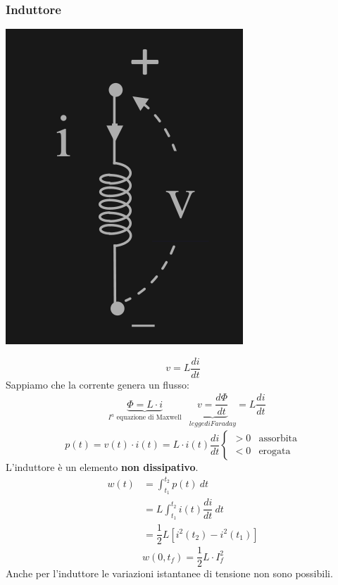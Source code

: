 \documentclass{article}
\begin{document}
\subsubsection{Induttore}
\begin{center}
    \includegraphics[scale=0.22]{Image/Induttore.png}
\end{center}
\[
    v= L \dfrac{di}{dt}
\]
Sappiamo che la corrente genera un flusso:
\begin{align*}
    &\underbrace{\Phi = L \cdot i}_{I^a\text{ equazione di Maxwell}} & \underbrace{v= \dfrac{d \Phi}{dt}}_{legge di Faraday} = L \dfrac{di}{dt}
\end{align*}
\[
    p(t) = v(t) \cdot i(t) = L \cdot i(t) \dfrac{di}{dt} \begin{cases}
        >0 &\text{assorbita}\\
        <0 &\text{erogata}
    \end{cases}
\]
L'induttore è un elemento \textbf{non dissipativo}.
\begin{align*}
    w(t) &= \int_{t_1}^{t_2} p(t) \ dt\\
    &=L \int_{t_1}^{t_2}i(t) \dfrac{di}{dt} \ dt \\
    &= \dfrac{1}{2} L \left[ i^2(t_2) -i^2(t_1)  \right]
\end{align*}
\[
    w(0,t_f) = \dfrac{1}{2} L \cdot  I^2_f
\]
Anche per l'induttore le variazioni istantanee di tensione non sono possibili.
\end{document}
